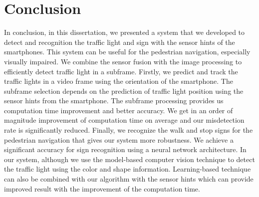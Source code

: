 \chapter{Conclusion}

In conclusion, in this dissertation, we presented a system that we developed to detect and recognition the traffic light and sign with the sensor hints of the smartphones.
This system can be useful for the pedestrian navigation, especially visually impaired.
We combine the sensor fusion with the image processing to efficiently detect traffic light in a subframe.
Firstly, we predict and track the traffic lights in a video frame using the orientation of the smartphone.
The subframe selection depends on the prediction of traffic light position using the sensor hints from the smartphone.
The subframe processing provides us computation time improvement and better accuracy.
We get in an order of magnitude improvement of computation time on average and our misdetection rate is significantly reduced.
Finally, we recognize the walk and stop signs for the pedestrian navigation that gives our system more robustness.
We achieve a significant accuracy for sign recognition using a neural network architecture.
In our system, although we use the model-based computer vision technique to detect the traffic light using the color and shape information.
Learning-based technique can also be combined with our algorithm with the sensor hints which can provide improved result with the improvement of the computation time.


